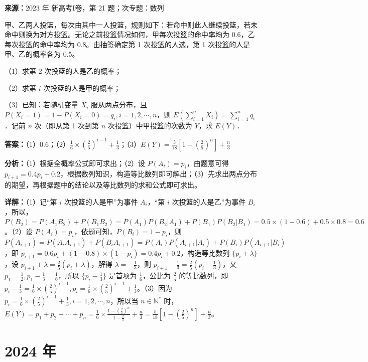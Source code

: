 \begin{question}[points=12]
\textbf{来源：}2023 年 新高考I卷，第 21 题；次专题：数列\par
甲、乙两人投篮，每次由其中一人投篮，规则如下：若命中则此人继续投篮，若未命中则换为对方投篮。无论之前投篮情况如何，甲每次投篮的命中率均为 0.6，乙每次投篮的命中率均为 0.8。由抽签确定第 1 次投篮的人选，第 1 次投篮的人是甲、乙的概率各为 0.5。

（1）求第 2 次投篮的人是乙的概率；

（2）求第 $i$ 次投篮的人是甲的概率；

（3）已知：若随机变量 $X_i$ 服从两点分布，且 $P(X_i=1)=1-P(X_i=0)=q_i, i=1,2,\cdots,n$，则 $E(\sum_{i=1}^n X_i)=\sum_{i=1}^n q_i$．记前 $n$ 次（即从第 1 次到第 $n$ 次投篮）中甲投篮的次数为 $Y$，求 $E(Y)$．
\begin{solution}
\textbf{答案：}（1）0.6；（2）$\frac{1}{6}\times(\frac{2}{5})^{i-1}+\frac{1}{3}$；（3）$E(Y)=\frac{5}{18}[1-(\frac{2}{5})^n]+\frac{n}{3}$

\textbf{分析：}（1）根据全概率公式即可求出；（2）设 $P(A_i)=p_i$，由题意可得 $p_{i+1}=0.4p_i+0.2$，根据数列知识，构造等比数列即可解出；（3）先求出两点分布的期望，再根据题中的结论以及等比数列的求和公式即可求出。

\textbf{详解：}（1）记“第 $i$ 次投篮的人是甲”为事件 $A_i$，“第 $i$ 次投篮的人是乙”为事件 $B_i$，所以，$P(B_2)=P(A_1B_2)+P(B_1B_2)=P(A_1)P(B_2|A_1)+P(B_1)P(B_2|B_1)=0.5\times(1-0.6)+0.5\times0.8=0.6$。（2）设 $P(A_i)=p_i$，依题可知，$P(B_i)=1-p_i$，则 $P(A_{i+1})=P(A_iA_{i+1})+P(B_iA_{i+1})=P(A_i)P(A_{i+1}|A_i)+P(B_i)P(A_{i+1}|B_i)$，即 $p_{i+1}=0.6p_i+(1-0.8)\times(1-p_i)=0.4p_i+0.2$，构造等比数列 $\{p_i+\lambda\}$，设 $p_{i+1}+\lambda=\frac{2}{5}(p_i+\lambda)$，解得 $\lambda=-\frac{1}{3}$，则 $p_{i+1}-\frac{1}{3}=\frac{2}{5}(p_i-\frac{1}{3})$，又 $p_1=\frac{1}{2}, p_1-\frac{1}{3}=\frac{1}{6}$，所以 $\{p_i-\frac{1}{3}\}$ 是首项为 $\frac{1}{6}$，公比为 $\frac{2}{5}$ 的等比数列，即 $p_i-\frac{1}{3}=\frac{1}{6}\times(\frac{2}{5})^{i-1}, p_i=\frac{1}{6}\times(\frac{2}{5})^{i-1}+\frac{1}{3}$。（3）因为 $p_i=\frac{1}{6}\times(\frac{2}{5})^{i-1}+\frac{1}{3}, i=1,2,\cdots,n$，所以当 $n\in\mathbb{N}^*$ 时，$E(Y)=p_1+p_2+\cdots+p_n=\frac{1}{6}\times\frac{1-(\frac{2}{5})^n}{1-\frac{2}{5}}+\frac{n}{3}=\frac{5}{18}[1-(\frac{2}{5})^n]+\frac{n}{3}$。
\end{solution}
\end{question}

\section*{2024 年}

